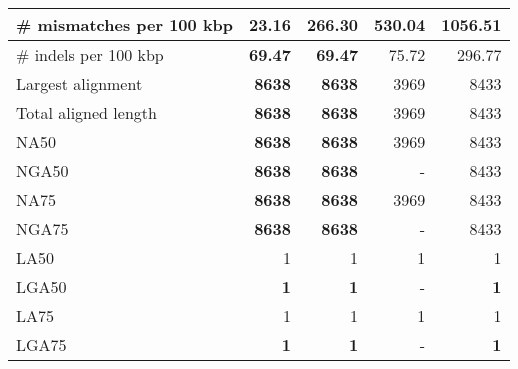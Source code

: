 \documentclass[12pt,a4paper]{article}
\begin{document}
\begin{table}[ht]
\begin{center}
\begin{tabular}{|l*{4}{|r}|}
\# mismatches per 100 kbp & {\bf 23.16} & 266.30 & 530.04 & 1056.51 \\ \hline
\# indels per 100 kbp & {\bf 69.47} & {\bf 69.47} & 75.72 & 296.77 \\ \hline
Largest alignment & {\bf 8638} & {\bf 8638} & 3969 & 8433 \\ \hline
Total aligned length & {\bf 8638} & {\bf 8638} & 3969 & 8433 \\ \hline
NA50 & {\bf 8638} & {\bf 8638} & 3969 & 8433 \\ \hline
NGA50 & {\bf 8638} & {\bf 8638} & - & 8433 \\ \hline
NA75 & {\bf 8638} & {\bf 8638} & 3969 & 8433 \\ \hline
NGA75 & {\bf 8638} & {\bf 8638} & - & 8433 \\ \hline
LA50 & 1 & 1 & 1 & 1 \\ \hline
LGA50 & {\bf 1} & {\bf 1} & - & {\bf 1} \\ \hline
LA75 & 1 & 1 & 1 & 1 \\ \hline
LGA75 & {\bf 1} & {\bf 1} & - & {\bf 1} \\ \hline
\end{tabular}
\end{center}
\end{table}
\end{document}
